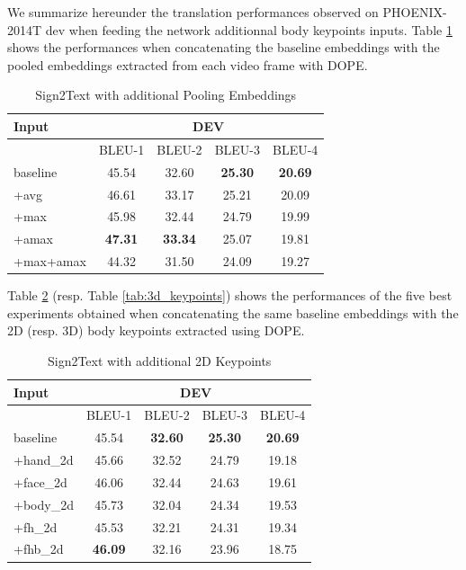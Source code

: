 \documentclass[final]{cvpr}
\begin{document}
We summarize hereunder the translation performances observed on PHOENIX-2014T dev when feeding the network additionnal body keypoints inputs. Table \ref{tab:embeddings} shows the performances when concatenating the baseline embeddings \cite{neccam} with the pooled embeddings extracted from each video frame with DOPE.
\begin{table}[H]
\centering
\def\arraystretch{0.9}
\begin{tabular}{l c c c c}
	\toprule
	Input &  \multicolumn{4}{c}{DEV}\\
	\midrule
	{}   & BLEU-1   & BLEU-2    & BLEU-3   & BLEU-4\\
	baseline   &  45.54 & 32.60  & \textbf{25.30}  & \textbf{20.69}\\
	+avg   &  46.61 & 33.17   & 25.21  & 20.09\\
	+max   &  45.98  &  32.44   & 24.79  & 19.99\\
	+amax  &  \textbf{47.31} &  \textbf{33.34}   & 25.07  & 19.81\\
	+max+amax  &  44.32 & 31.50  & 24.09  & 19.27\\
	\bottomrule
\end{tabular}
\vspace{-0.4\baselineskip}
\caption{Sign2Text with additional Pooling Embeddings}
\label{tab:embeddings}
\end{table}
Table \ref{tab:2d_keypoints} (resp. Table \ref{tab:3d_keypoints}) shows the performances of the five best experiments obtained when concatenating the same baseline embeddings with the 2D (resp. 3D) body keypoints extracted using DOPE. 
\begin{table}[h]
	\centering
	\def\arraystretch{0.9}
	\begin{tabular}{l c c c c}
		\toprule
		Input &  \multicolumn{4}{c}{DEV}\\
		\midrule
		{}   & BLEU-1   & BLEU-2    & BLEU-3   & BLEU-4\\
		baseline  &  45.54 & \textbf{32.60}  & \textbf{25.30}  & \textbf{20.69}\\
		+hand\_2d   &  45.66 & 32.52   & 24.79  & 19.18\\
		+face\_2d   &  46.06  &  32.44   & 24.63  & 19.61\\
		+body\_2d   &  45.73 &  32.04   & 24.34  & 19.53\\	
		+fh\_2d\footnotemark[3]  &  45.53 &  32.21  & 24.31  & 19.34\\	
		+fhb\_2d\footnotemark[4] &  \textbf{46.09} &  32.16   & 23.96  & 18.75\\	
		\bottomrule
	\end{tabular}
	\vspace{-0.4\baselineskip}
	\caption{Sign2Text with additional 2D Keypoints}
	\label{tab:2d_keypoints}
\end{table}
\end{document}
